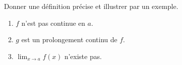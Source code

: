 
\begin{exercice}\label{exocontinueSupl2}


Donner une définition précise et illustrer par un exemple. 
\begin{enumerate}
\item $f$ n'est pas continue en $a$.
\item $g$ est un prolongement continu de $f$.
\item $\lim_{x\to  a}f(x)$ n'existe pas.
\end{enumerate}


\end{exercice}
